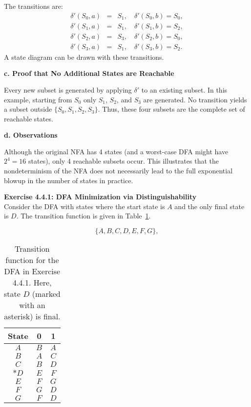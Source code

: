 \documentclass{article}
\theoremstyle{theorem}
\theoremstyle{definition}
\theoremstyle{remark}
\begin{document}
The transitions are:
\[
\begin{array}{rcl}
\delta'(S_0,a) &=& S_1,\quad \delta'(S_0,b)=S_0,\\[1mm]
\delta'(S_1,a) &=& S_1,\quad \delta'(S_1,b)=S_2,\\[1mm]
\delta'(S_2,a) &=& S_3,\quad \delta'(S_2,b)=S_0,\\[1mm]
\delta'(S_3,a) &=& S_1,\quad \delta'(S_3,b)=S_2.
\end{array}
\]
A state diagram can be drawn with these transitions.

\textbf{c. Proof that No Additional States are Reachable}

Every new subset is generated by applying \(\delta'\) to an existing subset. In this example, starting from \(S_0\) only \(S_1\), \(S_2\), and \(S_3\) are generated. No transition yields a subset outside \(\{S_0,S_1,S_2,S_3\}\). Thus, these four subsets are the complete set of reachable states.

\textbf{d. Observations}

Although the original NFA has 4 states (and a worst-case DFA might have \(2^4=16\) states), only 4 reachable subsets occur. This illustrates that the nondeterminism of the NFA does not necessarily lead to the full exponential blowup in the number of states in practice.


\textbf{Exercise 4.4.1: DFA Minimization via Distinguishability}\\
Consider the DFA with states where the start state is \(A\) and the only final state is \(D\). The transition function is given in Table~\ref{tab:dfa1}.

\[
\{A, B, C, D, E, F, G\},
\]

\begin{table}[h]
  \centering
  \begin{tabular}{c|cc}
    \textbf{State} & \textbf{0} & \textbf{1} \\ \hline
    \(A\) & \(B\) & \(A\) \\
    \(B\) & \(A\) & \(C\) \\
    \(C\) & \(B\) & \(D\) \\
    \(*D\) & \(E\) & \(F\) \\
    \(E\) & \(F\) & \(G\) \\
    \(F\) & \(G\) & \(D\) \\
    \(G\) & \(F\) & \(D\) \\
  \end{tabular}
  \caption{Transition function for the DFA in Exercise 4.4.1. Here, state \(D\) (marked with an asterisk) is final.}
  \label{tab:dfa1}
\end{table}
\end{document}
